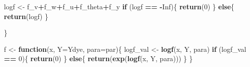 \documentclass[
]{article}
\newenvironment{Shaded}{\begin{snugshade}}{\end{snugshade}}
\newcommand{\AttributeTok}[1]{\textcolor[rgb]{0.13,0.29,0.53}{#1}}
\newcommand{\ConstantTok}[1]{\textcolor[rgb]{0.56,0.35,0.01}{#1}}
\newcommand{\ControlFlowTok}[1]{\textcolor[rgb]{0.13,0.29,0.53}{\textbf{#1}}}
\newcommand{\DecValTok}[1]{\textcolor[rgb]{0.00,0.00,0.81}{#1}}
\newcommand{\FloatTok}[1]{\textcolor[rgb]{0.00,0.00,0.81}{#1}}
\newcommand{\FunctionTok}[1]{\textcolor[rgb]{0.13,0.29,0.53}{\textbf{#1}}}
\newcommand{\NormalTok}[1]{#1}
\newcommand{\OtherTok}[1]{\textcolor[rgb]{0.56,0.35,0.01}{#1}}
\newcommand{\SpecialCharTok}[1]{\textcolor[rgb]{0.81,0.36,0.00}{\textbf{#1}}}
\begin{document}
\begin{Shaded}
\begin{Highlighting}[]
\NormalTok{  logf }\OtherTok{\textless{}{-}}\NormalTok{ f\_v}\SpecialCharTok{+}\NormalTok{f\_w}\SpecialCharTok{+}\NormalTok{f\_u}\SpecialCharTok{+}\NormalTok{f\_theta}\SpecialCharTok{+}\NormalTok{f\_y}
  \ControlFlowTok{if}\NormalTok{ (logf }\SpecialCharTok{==} \SpecialCharTok{{-}}\ConstantTok{Inf}\NormalTok{)\{}
    \FunctionTok{return}\NormalTok{(}\DecValTok{0}\NormalTok{)}
\NormalTok{  \}}
  \ControlFlowTok{else}\NormalTok{\{}
    \FunctionTok{return}\NormalTok{(logf) }
\NormalTok{  \}}
  
\NormalTok{\}}

\NormalTok{f }\OtherTok{\textless{}{-}} \ControlFlowTok{function}\NormalTok{(x, }\AttributeTok{Y=}\NormalTok{Ydye, }\AttributeTok{para=}\NormalTok{par)\{}
\NormalTok{  logf\_val }\OtherTok{\textless{}{-}} \FunctionTok{logf}\NormalTok{(x, Y, para)}
\ControlFlowTok{if}\NormalTok{ (logf\_val }\SpecialCharTok{==} \DecValTok{0}\NormalTok{)\{}
    \FunctionTok{return}\NormalTok{(}\DecValTok{0}\NormalTok{)}
\NormalTok{  \}}
  \ControlFlowTok{else}\NormalTok{\{}
    \FunctionTok{return}\NormalTok{(}\FunctionTok{exp}\NormalTok{(}\FunctionTok{logf}\NormalTok{(x, Y, para)))}
\NormalTok{  \}}
\NormalTok{\}}
\end{Highlighting}
\end{Shaded}

\begin{Shaded}
\end{Shaded}
\end{document}

